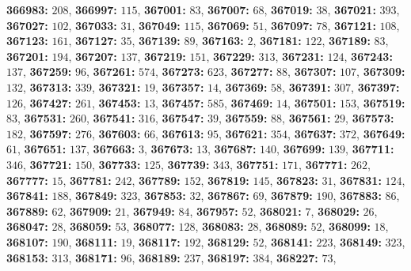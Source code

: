 \textsf{\bfseries 366983:} $208$, \textsf{\bfseries 366997:} $115$, \textsf{\bfseries 367001:} $83$, \textsf{\bfseries 367007:} $68$, \textsf{\bfseries 367019:} $38$, \textsf{\bfseries 367021:} $393$, \textsf{\bfseries 367027:} $102$, \textsf{\bfseries 367033:} $31$, \textsf{\bfseries 367049:} $115$, \textsf{\bfseries 367069:} $51$, \textsf{\bfseries 367097:} $78$, \textsf{\bfseries 367121:} $108$, \textsf{\bfseries 367123:} $161$, \textsf{\bfseries 367127:} $35$, \textsf{\bfseries 367139:} $89$, \textsf{\bfseries 367163:} $2$, \textsf{\bfseries 367181:} $122$, \textsf{\bfseries 367189:} $83$, \textsf{\bfseries 367201:} $194$, \textsf{\bfseries 367207:} $137$, \textsf{\bfseries 367219:} $151$, \textsf{\bfseries 367229:} $313$, \textsf{\bfseries 367231:} $124$, \textsf{\bfseries 367243:} $137$, \textsf{\bfseries 367259:} $96$, \textsf{\bfseries 367261:} $574$, \textsf{\bfseries 367273:} $623$, \textsf{\bfseries 367277:} $88$, \textsf{\bfseries 367307:} $107$, \textsf{\bfseries 367309:} $132$, \textsf{\bfseries 367313:} $339$, \textsf{\bfseries 367321:} $19$, \textsf{\bfseries 367357:} $14$, \textsf{\bfseries 367369:} $58$, \textsf{\bfseries 367391:} $307$, \textsf{\bfseries 367397:} $126$, \textsf{\bfseries 367427:} $261$, \textsf{\bfseries 367453:} $13$, \textsf{\bfseries 367457:} $585$, \textsf{\bfseries 367469:} $14$, \textsf{\bfseries 367501:} $153$, \textsf{\bfseries 367519:} $83$, \textsf{\bfseries 367531:} $260$, \textsf{\bfseries 367541:} $316$, \textsf{\bfseries 367547:} $39$, \textsf{\bfseries 367559:} $88$, \textsf{\bfseries 367561:} $29$, \textsf{\bfseries 367573:} $182$, \textsf{\bfseries 367597:} $276$, \textsf{\bfseries 367603:} $66$, \textsf{\bfseries 367613:} $95$, \textsf{\bfseries 367621:} $354$, \textsf{\bfseries 367637:} $372$, \textsf{\bfseries 367649:} $61$, \textsf{\bfseries 367651:} $137$, \textsf{\bfseries 367663:} $3$, \textsf{\bfseries 367673:} $13$, \textsf{\bfseries 367687:} $140$, \textsf{\bfseries 367699:} $139$, \textsf{\bfseries 367711:} $346$, \textsf{\bfseries 367721:} $150$, \textsf{\bfseries 367733:} $125$, \textsf{\bfseries 367739:} $343$, \textsf{\bfseries 367751:} $171$, \textsf{\bfseries 367771:} $262$, \textsf{\bfseries 367777:} $15$, \textsf{\bfseries 367781:} $242$, \textsf{\bfseries 367789:} $152$, \textsf{\bfseries 367819:} $145$, \textsf{\bfseries 367823:} $31$, \textsf{\bfseries 367831:} $124$, \textsf{\bfseries 367841:} $188$, \textsf{\bfseries 367849:} $323$, \textsf{\bfseries 367853:} $32$, \textsf{\bfseries 367867:} $69$, \textsf{\bfseries 367879:} $190$, \textsf{\bfseries 367883:} $86$, \textsf{\bfseries 367889:} $62$, \textsf{\bfseries 367909:} $21$, \textsf{\bfseries 367949:} $84$, \textsf{\bfseries 367957:} $52$, \textsf{\bfseries 368021:} $7$, \textsf{\bfseries 368029:} $26$, \textsf{\bfseries 368047:} $28$, \textsf{\bfseries 368059:} $53$, \textsf{\bfseries 368077:} $128$, \textsf{\bfseries 368083:} $28$, \textsf{\bfseries 368089:} $52$, \textsf{\bfseries 368099:} $18$, \textsf{\bfseries 368107:} $190$, \textsf{\bfseries 368111:} $19$, \textsf{\bfseries 368117:} $192$, \textsf{\bfseries 368129:} $52$, \textsf{\bfseries 368141:} $223$, \textsf{\bfseries 368149:} $323$, \textsf{\bfseries 368153:} $313$, \textsf{\bfseries 368171:} $96$, \textsf{\bfseries 368189:} $237$, \textsf{\bfseries 368197:} $384$, \textsf{\bfseries 368227:} $73$, 
